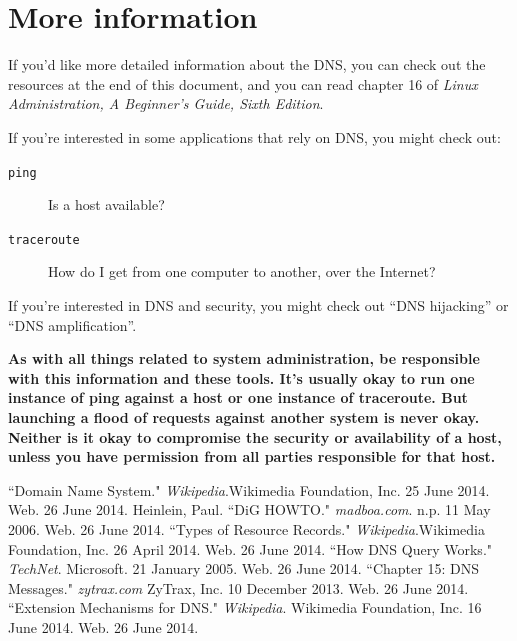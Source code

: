 \documentclass[11pt,a4paper]{article}
\begin{document}
\section{More information}

If you'd like more detailed information about the DNS, you can check out the
resources at the end of this document, and you can read chapter 16 of \textit{
Linux Administration, A Beginner's Guide, Sixth Edition}.

If you're interested in some applications that rely on DNS, you might check out:
\begin{description}
\item[\texttt{ping}] Is a host available?
\item[\texttt{traceroute}] How do I get from one computer to another, over the
Internet?
\end{description}

If you're interested in DNS and security, you might check out ``DNS hijacking''
or ``DNS amplification''.

\textbf{As with all things related to system administration, be responsible with
this information and these tools. It's usually okay to run one instance of ping
against a host or one instance of traceroute. But launching a flood of requests
against another system is never okay. Neither is it okay to compromise the
security or availability of a host, unless you have permission from all parties
responsible for that host.}

\begin{thebibliography}{15}
\addtolength{\leftmargin}{0.2in}
\setlength{\itemindent}{-0.2in}

     ``Domain Name System." \emph{Wikipedia}.Wikimedia Foundation, Inc. 25 June 2014. Web. 26 June 2014. 
     Heinlein, Paul. ``DiG HOWTO." \emph{madboa.com}. n.p. 11 May 2006. Web. 26 June 2014.
     ``Types of Resource Records." \emph{Wikipedia}.Wikimedia Foundation, Inc. 26 April 2014. Web. 26 June 2014. 
     ``How DNS Query Works." \emph{TechNet}. Microsoft. 21 January 2005. Web. 26 June 2014.
     ``Chapter 15: DNS Messages." \emph{zytrax.com} ZyTrax, Inc. 10 December 2013. Web. 26 June 2014.
     ``Extension Mechanisms for DNS." \emph{Wikipedia}. Wikimedia Foundation, Inc. 16 June 2014. Web. 26 June 2014. 
   
\end{thebibliography}
\end{document}
